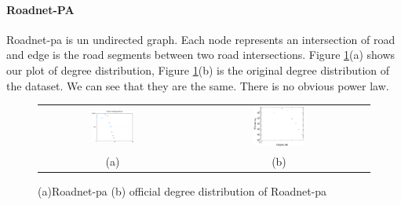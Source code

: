 \paragraph{Roadnet-PA}
Roadnet-pa is un undirected graph. Each node represents an intersection of road and edge is the road segments between two road intersections. Figure \ref{t1:pa}(a) shows our plot of degree distribution, Figure \ref{t1:pa}(b) is the original degree distribution of the dataset. We can see that they are the same. There is no obvious power law.
\begin{figure}[!htbf]
\begin{center}
\begin{tabular}{c c}
     \includegraphics[width=0.3\textwidth]{FIG/t1_pa.png} & 
     \includegraphics[width=0.3\textwidth]{FIG/t1_pa_truth.png}\\
    (a) & (b)\\
\end{tabular}
\caption{(a)Roadnet-pa (b) official degree distribution of Roadnet-pa}
\label{t1:pa}
\end{center}
\end{figure}

